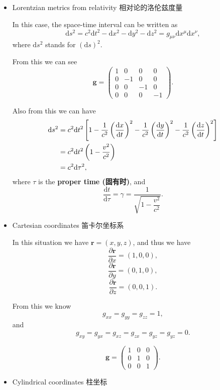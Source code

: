 \begin{itemize}
\tightlist{}
\item
  Lorentzian metrics from relativity 相对论的洛伦兹度量

  In this case, the space-time interval can be written as
  \[\mathrm{d} s^2 = c^2 \mathrm{d}t^2 - \mathrm{d} x^2 - \mathrm{d} y^2 - \mathrm{d} z^2 = g_{\mu\nu} \mathrm{d}x^{\mu} \mathrm{d}x^{\nu},\]
  where \(\mathrm{d} s^2\) stands for \((\mathrm{d} s)^2\).

  From this we can see \[\mathbf{g} = \begin{pmatrix}
        1 & 0 & 0 & 0 \\
        0 & -1 & 0 & 0 \\
        0 & 0 & -1 & 0 \\
        0 & 0 & 0 & -1
    \end{pmatrix}.\]

  Also from this we can have
  \begin{align*} \mathrm{d} s^2 & = c^2 \mathrm{d}t^2 \left[ 1 - \frac{1}{c^2} \left( \frac{\mathrm{d}x}{\mathrm{d}t} \right)^2 - \frac{1}{c^2} \left( \frac{\mathrm{d}y}{\mathrm{d}t} \right)^2 - \frac{1}{c^2} \left( \frac{\mathrm{d}z}{\mathrm{d}t} \right)^2 \right] \\
        & = c^2 \mathrm{d}t^2 \left( 1 - {v^2 \over c^2} \right) \\
        & = c^2 \mathrm{d} \tau^2,
    \end{align*} where \(\tau\) is the \textbf{proper time (固有时)},
  and
  \[\frac{\mathrm{d}t}{\mathrm{d} \tau} = \gamma = \frac{1}{\sqrt{1 - \dfrac{v^2}{c^2}}}.\]
\item
  Cartesian coordinates 笛卡尔坐标系

  In this situation we have \(\boldsymbol{r} = (x, y, z)\), and thus we
  have \[\frac{\partial \boldsymbol{r}}{\partial x} = (1, 0, 0),\]
  \[\frac{\partial \boldsymbol{r}}{\partial y} = (0, 1, 0),\]
  \[\frac{\partial \boldsymbol{r}}{\partial z} = (0, 0, 1).\]

  From this we know \[g_{xx} = g_{yy} = g_{zz} = 1, \] and
  \[g_{xy} = g_{yx} = g_{xz} = g_{zx} = g_{yz} = g_{yz} =0.\]

  \[\mathbf{g} = \begin{pmatrix}
        1 & 0 & 0 \\
        0 & 1 & 0 \\
        0 & 0 & 1
    \end{pmatrix}.\]
\item
  Cylindrical coordinates 柱坐标


\end{itemize}
